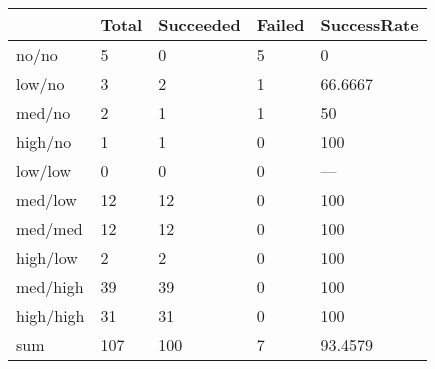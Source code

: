 \begin{tabular}{lllll}
& Total & Succeeded & Failed & SuccessRate \\ 
\hline 
no/no & 5 & 0 & 5 & 0 \\ 
low/no & 3 & 2 & 1 & 66.6667 \\ 
med/no & 2 & 1 & 1 & 50 \\ 
high/no & 1 & 1 & 0 & 100 \\ 
low/low & 0 & 0 & 0 & --- \\ 
med/low & 12 & 12 & 0 & 100 \\ 
med/med & 12 & 12 & 0 & 100 \\ 
high/low & 2 & 2 & 0 & 100 \\ 
med/high & 39 & 39 & 0 & 100 \\ 
high/high & 31 & 31 & 0 & 100 \\ 
sum & 107 & 100 & 7 & 93.4579 \\ 
\hline 
\end{tabular}